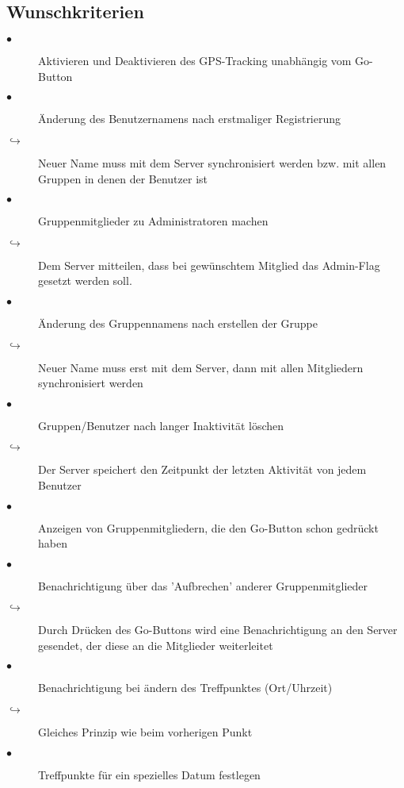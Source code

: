 \documentclass{scrartcl}
\begin{document}
\subsection{Wunschkriterien}
\begin{description}
\item[$\bullet$] Aktivieren und Deaktivieren des GPS-Tracking unabhängig vom Go-Button
\item[$\bullet$] Änderung des Benutzernamens nach erstmaliger Registrierung
\item[$\hookrightarrow$] Neuer Name muss mit dem Server synchronisiert werden bzw. mit allen Gruppen in denen der Benutzer ist
\item[$\bullet$] Gruppenmitglieder zu Administratoren machen
\item[$\hookrightarrow$] Dem Server mitteilen, dass bei gewünschtem Mitglied das Admin-Flag gesetzt werden soll.
\item[$\bullet$] Änderung des Gruppennamens nach erstellen der Gruppe
\item[$\hookrightarrow$] Neuer Name muss erst mit dem Server, dann mit allen Mitgliedern synchronisiert werden
\item[$\bullet$] Gruppen/Benutzer nach langer Inaktivität löschen
\item[$\hookrightarrow$] Der Server speichert den Zeitpunkt der letzten Aktivität von jedem Benutzer
\item[$\bullet$] Anzeigen von Gruppenmitgliedern, die den Go-Button schon gedrückt haben
\item[$\bullet$] Benachrichtigung über das 'Aufbrechen' anderer Gruppenmitglieder
\item[$\hookrightarrow$] Durch Drücken des Go-Buttons wird eine Benachrichtigung an den Server gesendet, der diese an die Mitglieder weiterleitet
\item[$\bullet$] Benachrichtigung bei ändern des Treffpunktes (Ort/Uhrzeit)
\item[$\hookrightarrow$] Gleiches Prinzip wie beim vorherigen Punkt
\item[$\bullet$] Treffpunkte für ein spezielles Datum festlegen
\end{description}
\end{document}
